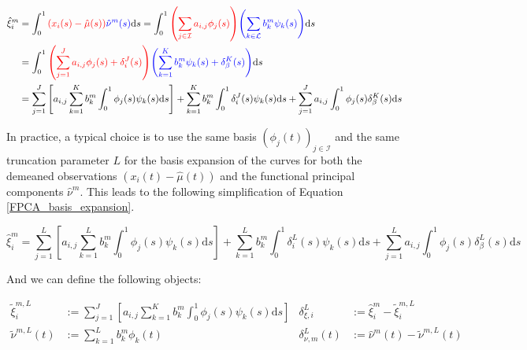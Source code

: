 \documentclass[11pt,twoside,a4paper]{article}
\begin{document}
	\begin{equation}\label{FPCA_basis_expansion}
		\begin{split}
			\hat{\xi}_{i}^m & = \int_{0}^{1} {\color{red}\left( x_i(s) - \hat{\mu}(s)\right)} {\color{blue}\hat{\nu}^m(s)} \mathrm{d}s
			= \int_{0}^{1} {\color{red}\left(\sum_{j \in \mathcal{I}} a_{i,j} \phi_j(s)\right)} {\color{blue}\left(\sum_{k \in \mathcal{L}} b_{k}^m \psi_{k}(s)\right)} \mathrm{d}s \\
			& = \int_{0}^{1} {\color{red}\left(\sum_{j = 1}^{J} a_{i,j} \phi_j(s) + \delta_i^J(s)\right)} {\color{blue}\left(\sum_{k = 1}^{K} b_{k}^m \psi_{k}(s) + \delta_{\beta}^K(s)\right)} \mathrm{d}s \\
			& = \sum_{j = 1}^{J} \left[a_{i,j}\sum_{k = 1}^{K} b_{k}^m \int_{0}^{1} \phi_j(s) \psi_{k}(s)\mathrm{d}s \right] +  \sum_{k = 1}^{K} b_{k}^m \int_{0}^{1} \delta_i^J(s) \psi_{k}(s) \mathrm{d}s + \sum_{j = 1}^{J} a_{i,j} \int_{0}^{1}\phi_j(s) \delta_{\beta}^K(s) \mathrm{d}s
		\end{split}
	\end{equation}
	
	In practice, a typical choice is to use the same basis $\left(\phi_j(t)\right)_{j \in \mathcal{I}}$ and the same truncation parameter $L$ for the basis expansion of the curves for both the demeaned observations $\left(x_i(t) - \hat{\mu}(t)\right)$ and the functional principal components $\hat{\nu}^m$. This leads to the following simplification of Equation \ref{FPCA_basis_expansion}.
	
	\begin{equation}\label{score_approx}
			\hat{\xi}_{i}^m = \sum_{j = 1}^{L} \left[a_{i,j}\sum_{k = 1}^{L} b_{k}^m \int_{0}^{1} \phi_j(s) \psi_{k}(s)\mathrm{d}s \right] +  \sum_{k = 1}^{L} b_{k}^m \int_{0}^{1} \delta_i^L(s) \psi_{k}(s) \mathrm{d}s + \sum_{j = 1}^{L} a_{i,j} \int_{0}^{1}\phi_j(s) \delta_{\beta}^L(s) \mathrm{d}s
	\end{equation}

	And we can define the following objects:

		\begin{align}
			\tilde{\xi}^{m,L}_{i} & := \sum_{j = 1}^{J} \left[a_{i,j}\sum_{k = 1}^{K} b_{k}^m \int_{0}^{1} \phi_j(s) \psi_{k}(s)\mathrm{d}s \right] 
			& \delta_{\xi, i}^L & := \hat{\xi}_{i}^m - \tilde{\xi}^{m,L}_{i} \\
			\tilde{\nu}^{m,L}(t) & := \sum_{k = 1}^{L} b_{k}^m \phi_{k}(t) 
			& \delta_{\nu, m}^L(t) & := \hat{\nu}^m(t) - \tilde{\nu}^{m,L}(t)
		\end{align}	
	
\end{document}

